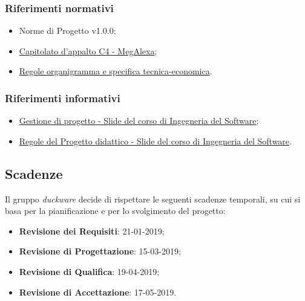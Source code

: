 \subsubsection{Riferimenti normativi}
\begin{itemize}
	\item Norme di Progetto v1.0.0;
	\item \href{https://www.math.unipd.it/~tullio/IS-1/2018/Progetto/C4.pdf}{Capitolato d'appalto C4 - MegAlexa};
	\item \href{https://www.math.unipd.it/~tullio/IS-1/2018/Progetto/RO.html}{Regole organigramma e specifica tecnica-economica}.
\end{itemize}
\subsubsection{Riferimenti informativi}
\begin{itemize}
	\item \href{https://www.math.unipd.it/~tullio/IS-1/2018/Dispense/L06.pdf}{Gestione di progetto - Slide del corso di Ingegneria del Software};
	\item \href{https://www.math.unipd.it/~tullio/IS-1/2018/Dispense/P01.pdf}{Regole del Progetto didattico - Slide del corso di Ingegneria del Software}.
\end{itemize}
\clearpage
\hypertarget{scadenze}{}
\subsection{Scadenze}
Il gruppo \emph{duckware} decide di rispettare le seguenti scadenze temporali, su cui si basa per la pianificazione e per lo svolgimento del progetto:
\begin{itemize}
	\item \textbf{Revisione dei Requisiti}: 21-01-2019;
	\item \textbf{Revisione di Progettazione}: 15-03-2019;
	\item \textbf{Revisione di Qualifica}: 19-04-2019;
	\item \textbf{Revisione di Accettazione}: 17-05-2019.
\end{itemize}
